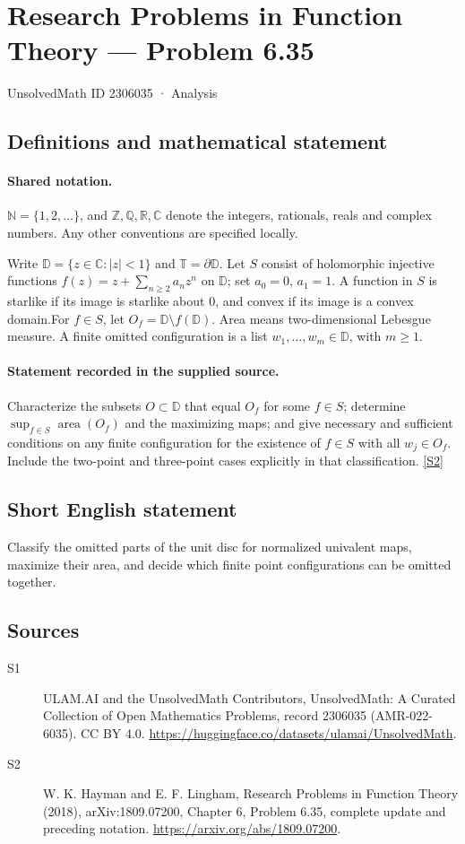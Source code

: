 \documentclass[11pt]{article}
\newcommand{\sref}[2]{\hyperlink{source:#1:#2}{[S#2]}}
\begin{document}
\setcounter{section}{2306034}
\section{Research Problems in Function Theory — Problem 6.35}\label{2306035}
{\small\sffamily UnsolvedMath ID 2306035 · Analysis}
\subsection{Definitions and mathematical statement}

\paragraph{Shared notation.}$\mathbb N=\{1,2,\ldots\}$, and $\mathbb Z,\mathbb Q,\mathbb R,\mathbb C$ denote the integers, rationals, reals and complex numbers. Any other conventions are specified locally.


Write $\mathbb D=\{z\in\mathbb C:|z|<1\}$ and $\mathbb T=\partial\mathbb D$. Let $S$ consist of holomorphic injective functions $f(z)=z+\sum_{n\ge2}a_nz^n$ on $\mathbb D$; set $a_0=0$, $a_1=1$. A function in $S$ is starlike if its image is starlike about $0$, and convex if its image is a convex domain.For $f\in S$, let $O_f=\mathbb D\setminus f(\mathbb D)$. Area means two-dimensional Lebesgue measure. A finite omitted configuration is a list $w_1,\ldots,w_m\in\mathbb D$, with $m\ge1$.
\paragraph{Statement recorded in the supplied source.}
Characterize the subsets $O\subset\mathbb D$ that equal $O_f$ for some $f\in S$; determine $\sup_{f\in S}\operatorname{area}(O_f)$ and the maximizing maps; and give necessary and sufficient conditions on any finite configuration for the existence of $f\in S$ with all $w_j\in O_f$. Include the two-point and three-point cases explicitly in that classification. \sref{2306035}{2}
\subsection{Short English statement}
Classify the omitted parts of the unit disc for normalized univalent maps, maximize their area, and decide which finite point configurations can be omitted together.
\subsection{Sources}
\begin{description}
\item[\hypertarget{source:2306035:1}{S1}] ULAM.AI and the UnsolvedMath Contributors, UnsolvedMath: A Curated Collection of Open Mathematics Problems, record 2306035 (AMR-022-6035). CC BY 4.0. \url{https://huggingface.co/datasets/ulamai/UnsolvedMath}.
\item[\hypertarget{source:2306035:2}{S2}] W. K. Hayman and E. F. Lingham, Research Problems in Function Theory (2018), arXiv:1809.07200, Chapter 6, Problem 6.35, complete update and preceding notation. \url{https://arxiv.org/abs/1809.07200}.
\end{description}
\label{end:2306035}
\end{document}
